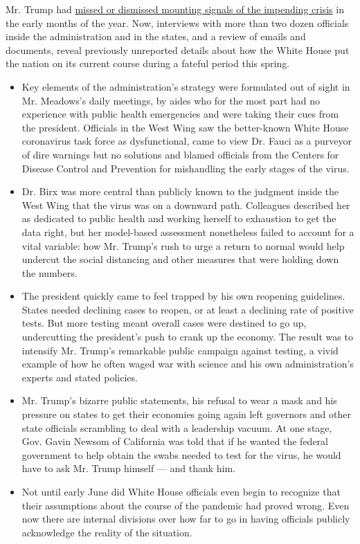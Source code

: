Mr. Trump had
\href{https://www.nytimes3xbfgragh.onion/2020/04/11/us/politics/coronavirus-trump-response.html}{missed
or dismissed mounting signals of the impending crisis} in the early
months of the year. Now, interviews with more than two dozen officials
inside the administration and in the states, and a review of emails and
documents, reveal previously unreported details about how the White
House put the nation on its current course during a fateful period this
spring.

\begin{itemize}
\item
  Key elements of the administration's strategy were formulated out of
  sight in Mr. Meadows's daily meetings, by aides who for the most part
  had no experience with public health emergencies and were taking their
  cues from the president. Officials in the West Wing saw the
  better-known White House coronavirus task force as dysfunctional, came
  to view Dr. Fauci as a purveyor of dire warnings but no solutions and
  blamed officials from the Centers for Disease Control and Prevention
  for mishandling the early stages of the virus.
\item
  Dr. Birx was more central than publicly known to the judgment inside
  the West Wing that the virus was on a downward path. Colleagues
  described her as dedicated to public health and working herself to
  exhaustion to get the data right, but her model-based assessment
  nonetheless failed to account for a vital variable: how Mr. Trump's
  rush to urge a return to normal would help undercut the social
  distancing and other measures that were holding down the numbers.
\item
  The president quickly came to feel trapped by his own reopening
  guidelines. States needed declining cases to reopen, or at least a
  declining rate of positive tests. But more testing meant overall cases
  were destined to go up, undercutting the president's push to crank up
  the economy. The result was to intensify Mr. Trump's remarkable public
  campaign against testing, a vivid example of how he often waged war
  with science and his own administration's experts and stated policies.
\item
  Mr. Trump's bizarre public statements, his refusal to wear a mask and
  his pressure on states to get their economies going again left
  governors and other state officials scrambling to deal with a
  leadership vacuum. At one stage, Gov. Gavin Newsom of California was
  told that if he wanted the federal government to help obtain the swabs
  needed to test for the virus, he would have to ask Mr. Trump himself
  --- and thank him.
\item
  Not until early June did White House officials even begin to recognize
  that their assumptions about the course of the pandemic had proved
  wrong. Even now there are internal divisions over how far to go in
  having officials publicly acknowledge the reality of the situation.
\end{itemize}

